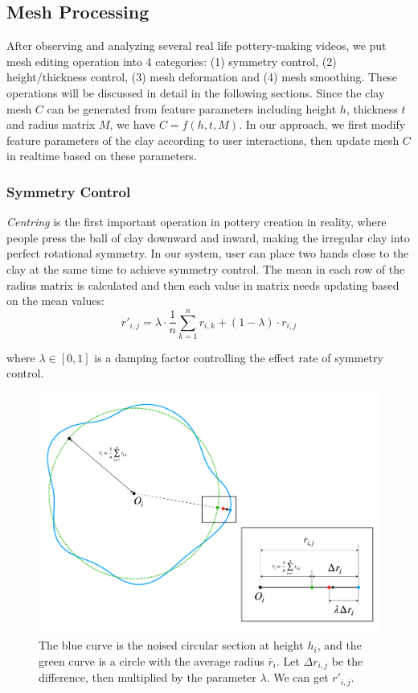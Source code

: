 \documentclass{svjour3}                     %
\begin{document}
\subsection{Mesh Processing}
\label{sec:4.2}
After observing and analyzing several real life pottery-making videos, we put mesh editing operation into 4 categories: (1) symmetry control, (2) height/thickness control, (3) mesh deformation and (4) mesh smoothing. These operations will be discussed in detail in the following sections.
Since the clay mesh $C$ can be generated from feature parameters including height $h$, thickness $t$ and radius matrix $M$, we have $ C =  f(h, t, M) $.
In our approach, we first modify feature parameters of the clay according to user interactions, then update mesh $C$  in realtime based on these parameters.

\subsubsection{Symmetry Control}
\label{sec:4.2.1}
\textit{Centring} is the first important operation in pottery creation in reality, where people press the ball of clay downward and inward, making the irregular clay into perfect rotational symmetry.
In our system, user can place two hands close to the clay at the same time to achieve symmetry control.
The mean in each row of the radius matrix is calculated and then each value in matrix needs updating based on the mean values:
\begin{equation}
r'_{i,j} = 
\lambda \cdot \frac{1}{n}\sum_{k=1}^{n} r_{i,k}
+ (1 - \lambda) \cdot r_{i,j}
\end{equation}

where $\lambda \in [0,1]$ is a damping factor controlling the effect rate of symmetry control.

\begin{figure}
  \includegraphics[width=\textwidth]{fig5.pdf}
\caption{The blue curve is the noised circular section at height $h_{i}$, and the green curve is a circle with the average radius $\bar r_{i}$. Let $\Delta r_{i,j}$ be the difference, then multiplied by the parameter $\lambda$. We can get $r'_{i, j}$.}
\label{fig:5}       %
\end{figure}
\end{document}
